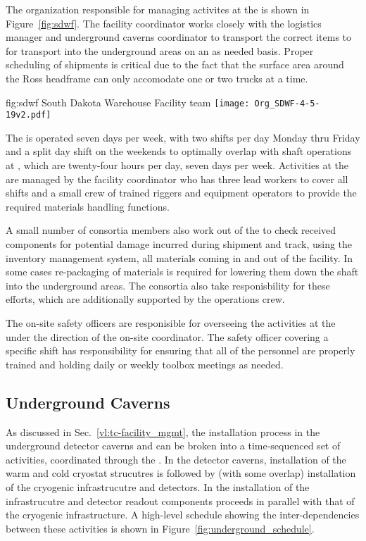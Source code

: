 The organization responsible for managing activites at the 
 is shown in Figure~\ref{fig:sdwf}.  The facility 
coordinator works closely with the  logistics 
manager and underground caverns coordinator to transport the 
correct items to  for transport into the underground
areas on an as needed basis.  Proper scheduling of shipments is 
critical due to the fact that the surface area around the Ross 
headframe can only accomodate one or two trucks at a time.   

\begin{dunefigure}{fig:sdwf}
  {South Dakota Warehouse Facility team}
  \texttt{[image: Org\_SDWF-4-5-19v2.pdf]}
\end{dunefigure}

The  is operated seven days per week, with two shifts 
per day Monday thru Friday and a split day shift on the weekends 
to optimally overlap with shaft operations at , which 
are twenty-four hours per day, seven days per week.  Activities at
the  are managed by the facility coordinator who has  
three lead workers to cover all shifts and a small crew of trained 
riggers and equipment operators to provide the required materials 
handling functions.  

A small number of  consortia members also work out of 
the  to check received components for potential damage 
incurred during shipment and track, using the inventory management 
system, all materials coming in and out of the facility.  In some 
cases re-packaging of materials is required for lowering them down
the shaft into the underground areas.  The  consortia
also take responisbility for these efforts, which are additionally
supported by the  operations crew.   

The on-site safety officers are responisible for overseeing the 
activities at the  under the direction of the on-site 
 coordinator.  The safety officer covering a specific 
shift has responsibility for ensuring that all of the 
personnel are properly trained and holding daily or weekly toolbox 
meetings as needed.

\subsection{Underground Caverns}

As discussed in Sec.~\ref{vl:tc-facility_mgmt}, the installation 
process in the underground detector caverns and  can 
be broken into a time-sequenced set of activities, coordinated 
through the .  In the detector caverns, installation 
of the warm and cold cryostat strucutres is followed by (with 
some overlap) installation of the cryogenic infrastrucutre and 
detectors.  In the  installation of the   
infrastrucutre and detector readout components proceeds in 
parallel with that of the cryogenic infrastructure.  A high-level 
schedule showing the inter-dependencies between these activities 
is shown in Figure~\ref{fig:underground_schedule}.

